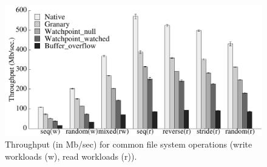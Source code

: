 \documentclass[letterpaper,twocolumn,10pt]{article}
\begin{document}
\begin{figure}[t!]
\includegraphics[width=.99\linewidth]{watchpoint.pdf}
\vspace{-6pt}
\caption{\label{fig:iozone-workload-overhead} Throughput (in Mb/sec) for common file system operations (write workloads (w), read workloads (r)).}
\end{figure}








\end{document}
